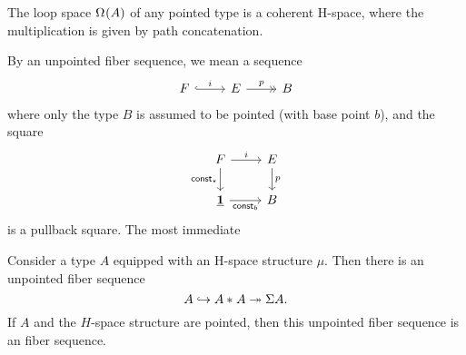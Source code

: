 \begin{eg}
  The loop space $\Omega^{}(A)$ of any pointed type is a coherent H-space, where the multiplication is given by path concatenation.
\end{eg}

By an unpointed fiber sequence, we mean a sequence
\begin{equation*}
  \begin{tikzcd}
    F \arrow[r,hook,"i"] & E \arrow[r,->>,"p"] & B
  \end{tikzcd}
\end{equation*}
where only the type $B$ is assumed to be pointed (with base point $b$), and the square
\begin{equation*}
  \begin{tikzcd}
    F \arrow[r,"i"] \arrow[d,swap,"\const_{\star}"] & E \arrow[d,"p"] \\
    \unit \arrow[r,swap,"\const_{b}"] & B
  \end{tikzcd}
\end{equation*}
is a pullback square. The most immediate 


\begin{thm}\label{thm:hopf-construction}
  Consider a type $A$ equipped with an H-space structure $\mu$. Then there is an unpointed fiber sequence
  \begin{equation*}
    A \hookrightarrow {A}\ast_{}{A} \twoheadrightarrow \Sigma A.
  \end{equation*}
  If $A$ and the $H$-space structure are pointed, then this unpointed fiber sequence is an fiber sequence.
\end{thm}

